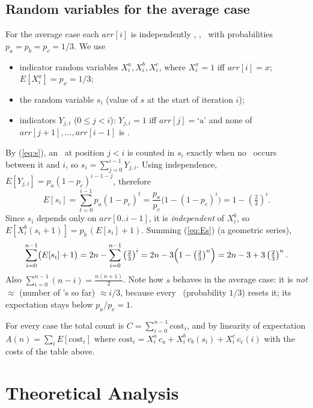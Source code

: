 \documentclass[11pt]{article}
\newcommand{\cha}{\text{`a'}}
\newcommand{\chb}{\text{`b'}}
\newcommand{\chc}{\text{`c'}}
\theoremstyle{remark}
\begin{document}
\subsection{Random variables for the average case}

For the average case each $arr[i]$ is independently \cha, \chb, \chc\ with
probabilities $p_a=p_b=p_c=1/3$. We use
\begin{itemize}[nosep]
\item indicator random variables $X_i^{a},X_i^{b},X_i^{c}$, where $X_i^{x}=1$ iff $arr[i]=x$;
  $E[X_i^x]=p_x=1/3$;
\item the random variable $s_i$ (value of $s$ at the start of iteration $i$);
\item indicators $Y_{j,i}$ ($0\le j<i$): $Y_{j,i}=1$ iff $arr[j]=\cha$ and none of
  $arr[j+1],\dots,arr[i-1]$ is \chc.
\end{itemize}
By (\ref{eq:s}), an \cha\ at position $j<i$ is counted in $s_i$ exactly when no \chc\
occurs between it and $i$, so $s_i=\sum_{j=0}^{i-1} Y_{j,i}$. Using independence,
$E[Y_{j,i}]=p_a(1-p_c)^{i-1-j}$, therefore
\begin{equation}\label{eq:Es}
E[s_i]=\sum_{t=0}^{i-1}p_a(1-p_c)^t=\frac{p_a}{p_c}\bigl(1-(1-p_c)^i\bigr)
      = 1-\left(\tfrac{2}{3}\right)^i .
\end{equation}
Since $s_i$ depends only on $arr[0..i-1]$, it is \emph{independent} of $X_i^{b}$, so
$E[X_i^{b}(s_i+1)]=p_b\,(E[s_i]+1)$. Summing (\ref{eq:Es}) (a geometric series),
\begin{equation}\label{eq:sum}
\sum_{i=0}^{n-1}\bigl(E[s_i]+1\bigr) = 2n-\sum_{i=0}^{n-1}\left(\tfrac23\right)^i
 = 2n-3\Bigl(1-\left(\tfrac23\right)^n\Bigr) = 2n-3+3\left(\tfrac23\right)^n .
\end{equation}
Also $\sum_{i=0}^{n-1}(n-i)=\frac{n(n+1)}{2}$. Note how $s$ behaves in the average case:
it is \emph{not} $\approx$ (number of \cha's so far) $\approx i/3$, because every \chc\
(probability $1/3$) resets it; its expectation stays below $p_a/p_c=1$.

For every case the total count is $C=\sum_{i=0}^{n-1}\text{cost}_i$, and by linearity of
expectation $A(n)=\sum_i E[\text{cost}_i]$ where
$\text{cost}_i = X_i^a\,c_a + X_i^b\,c_b(s_i) + X_i^c\,c_c(i)$ with the costs of the table above.

\section{Theoretical Analysis}
\end{document}
